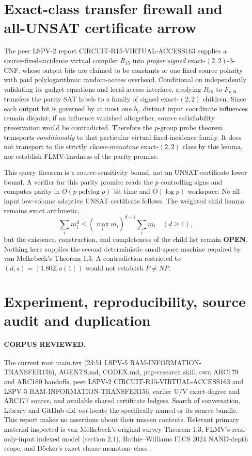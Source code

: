 \documentclass[11pt]{article}
\newcommand{\OPEN}{\textbf{OPEN}}
\begin{document}
\section{Exact-class transfer firewall and all-UNSAT certificate arrow}
The peer LSPV-2 report CIRCUIT-R15-VIRTUAL-ACCESS163 supplies a source-fixed-incidence virtual compiler $R_{15}$ into \emph{proper signed} exact-$(2,2)$-3-CNF, whose output bits are claimed to be constants or one fixed source polarity with paid polylogarithmic random-access overhead. Conditional on independently validating its gadget equations and local-access interface, applying $R_{15}$ to $F_{p,\mathbf b}$ transfers the parity SAT labels to a family of signed exact-$(2,2)$ children. Since each output bit is governed by at most one $b_i$, distinct input coordinate influences remain disjoint; if an influence vanished altogether, source satisfiability preservation would be contradicted. Therefore the $p$-group probe theorem transports \emph{conditionally} to that particular virtual fixed-incidence family. It does not transport to the strictly \emph{clause-monotone} exact-$(2,2)$ class by this lemma, nor establish FLMV-hardness of the parity promise.

This query theorem is a source-sensitivity bound, not an UNSAT-certificate lower bound. A verifier for this parity promise reads the $p$ controlling signs and computes parity in $O(p\operatorname{polylog}p)$ bit time and $O(\log p)$ workspace. No all-input low-volume adaptive UNSAT certificate follows. The weighted child lemma remains exact arithmetic,
\[
\sum_i m_i^d\le(\max_i m_i)^{d-1}\sum_i m_i\quad(d\ge1),
\]
but the existence, construction, and completeness of the child list remain \OPEN. Nothing here supplies the second deterministic small-space machine required by van Melkebeek's Theorem 1.3. A contradiction restricted to $(d,s)=(1.802,o(1))$ would not establish $P\ne NP$.

\section{Experiment, reproducibility, source audit and duplication}
\paragraph{CORPUS REVIEWED.} The current root main.tex (23:51 LSPV-5 RAM-INFORMATION-TRANSFER156), AGENTS.md, CODEX.md, pnp-research skill, own ARC179 and ARC180 handoffs, peer LSPV-2 CIRCUIT-R15-VIRTUAL-ACCESS163 and LSPV-5 RAM-INFORMATION-TRANSFER156, earlier U/V exact-degree and ARC177 source, and available shared certificate ledgers. Search of conversation, Library and GitHub did \emph{not} locate the specifically named  or its source bundle. This report makes no assertions about their unseen contents. Relevant primary material inspected is van Melkebeek's original survey Theorem 1.3, FLMV's read-only-input indexed model (section 2.1), Bathie--Williams ITCS 2024 NAND-depth scope, and D\"ocker's exact clause-monotone class \cite{vm2007,flmv2005,bw2024,doecker2019}.
\end{document}
